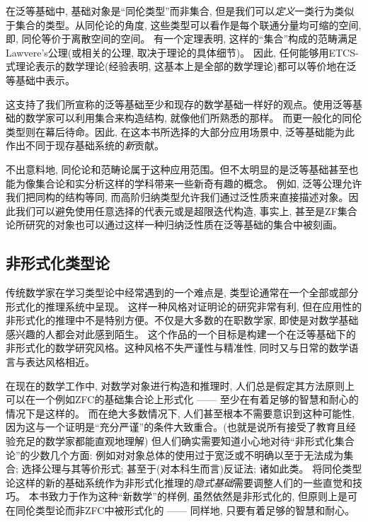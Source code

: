 在泛等基础中, 基础对象是``同伦类型''而非集合, 但是我们可以\emph{定义}一类行为类似于集合的类型。从同伦论的角度, 这些类型可以看作是每个联通分量均可缩的空间, 即, 同伦等价于离散空间的空间。
%
有一个定理表明, 这样的``集合''构成的范畴满足Lawvere's公理(或相关的公理, 取决于理论的具体细节)。
因此, 任何能够用ETCS-式理论表示的数学理论(经验表明, 这基本上是全部的数学理论)都可以等价地在泛等基础中表示。

这支持了我们所宣称的泛等基础至少和现存的数学基础一样好的观点。使用泛等基础的数学家可以利用集合来构造结构, 就像他们所熟悉的那样。
而更一般化的同伦类型则在幕后待命。因此, 在这本书所选择的大部分应用场景中, 泛等基础能为此作出不同于现存基础系统的\emph{新}贡献。

不出意料地, 同伦论和范畴论属于这种应用范围。但不太明显的是泛等基础甚至也能为像集合论和实分析这样的学科带来一些新奇有趣的概念。
例如, 泛等公理允许我们把同构的结构等同, 而高阶归纳类型允许我们通过泛性质来直接描述对象。因此我们可以避免使用任意选择的代表元或是超限迭代构造, 
事实上, 甚至是ZF集合论所研究的对象也可以通过这样一种归纳泛性质在泛等基础的集合中被刻画。

%


\subsection*{非形式化类型论}

%
%
%
%
传统数学家在学习类型论中经常遇到的一个难点是, 类型论通常在一个全部或部分形式化的推理系统中呈现。
这样一种风格对证明论的研究非常有利, 但在应用性的非形式化的推理中不是特别方便。不仅是大多数的在职数学家, 即使是对数学基础感兴趣的人都会对此感到陌生。
这个作品的一个目标是构建一个在泛等基础下的非形式化的数学研究风格。这种风格不失严谨性与精准性, 同时又与日常的数学语言与表达风格相近。

在现在的数学工作中, 对数学对象进行构造和推理时, 人们总是假定其方法原则上可以在一个例如ZFC的基础集合论上形式化 —— 至少在有着足够的智慧和耐心的情况下是这样的。
而在绝大多数情况下, 人们甚至根本不需要意识到这种可能性, 因为这与一个证明是``充分严谨''的条件大致重合。(也就是说所有接受了教育且经验充足的数学家都能直观地理解)
但人们确实需要知道小心地对待``非形式化集合论''的少数几个方面: 例如对对象总体的使用过于宽泛或不明确以至于无法成为集合; 选择公理与其等价形式; 甚至于(对本科生而言)反证法; 诸如此类。
将同伦类型论这样的新的基础系统作为非形式化推理的\emph{隐式基础}需要调整人们的一些直觉和技巧。
本书致力于作为这种``新数学''的样例, 虽然依然是非形式化的, 但原则上是可在同伦类型论而非ZFC中被形式化的 —— 同样地, 只要有着足够的智慧和耐心。

